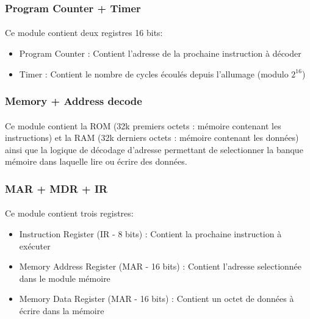\documentclass{article}
\begin{document}
    \subsubsection{Program Counter + Timer}
    \paragraph{}
    Ce module contient deux registres 16 bits:

    \begin{itemize}
        \item Program Counter : Contient l'adresse de la prochaine instruction à décoder
        \item Timer : Contient le nombre de cycles écoulés depuis l'allumage (modulo $2^{16}$)      
    \end{itemize}  

    \newpage

    \subsubsection{Memory + Address decode}
    \paragraph{}
    Ce module contient la ROM (32k premiers octets : mémoire contenant les instructions) et la RAM
    (32k derniers octets : mémoire contenant les données)
    ainsi que la logique de décodage d'adresse permettant de selectionner la banque mémoire dans laquelle lire
    ou écrire des données.
    

    \subsubsection{MAR + MDR + IR}
    \paragraph{}
    Ce module contient trois registres:

    \begin{itemize}
        \item Instruction Register (IR - 8 bits) : Contient la prochaine instruction à exécuter 
        \item Memory Address Register (MAR - 16 bits) : Contient l'adresse selectionnée dans le module mémoire 
        \item Memory Data Register (MAR - 16 bits) : Contient un octet de données à écrire dans la mémoire 
    \end{itemize}  
\end{document}
